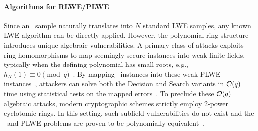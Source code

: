 \paragraph{Algorithms for RLWE/PLWE}
Since an \rlwe\ sample naturally translates into $N$ standard LWE samples, any known LWE algorithm can be directly applied. However, the polynomial ring structure introduces unique algebraic vulnerabilities. A primary class of attacks exploits ring homomorphisms to map seemingly secure instances into weak finite fields, typically when the defining polynomial has small roots, e.g., $h_N(1) \equiv 0 \pmod q$~\cite{EPRINT:EliasLP14}. By mapping \rlwe\ instances into these weak PLWE instances~\cite{EPRINT:EliasLP15}, attackers can solve both the Decision and Search variants in $\mathcal{O}(q)$ time using statistical tests on the mapped errors~\cite{SIAM:Chen16}. To preclude these $\mathcal{O}(q)$ algebraic attacks, modern cryptographic schemes strictly employ 2-power cyclotomic rings. In this setting, such subfield vulnerabilities do not exist and the \rlwe\ and PLWE problems are proven to be polynomially equivalent~\cite{EPRINT:RoscaS18}. 

